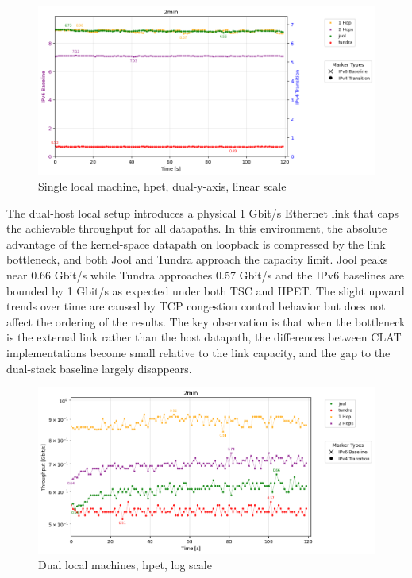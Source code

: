 \begin{figure}[H]
    \centering
    \includegraphics[width=1\textwidth]{resources/finalPlots/Jitterplots/LocalSingle_tcp_dualAxis_hpet_2min_linear.png}
    \caption{Single local machine, hpet, dual-y-axis, linear scale}
    \label{fig:Local_tcp_dualAxis_hpet_linear}
\end{figure}



The dual-host local setup introduces a physical 1 Gbit/s Ethernet link that caps the achievable throughput for all datapaths. In this environment, the absolute advantage of the kernel-space datapath on loopback is compressed by the link bottleneck, and both Jool and Tundra approach the capacity limit. Jool peaks near 0.66 Gbit/s while Tundra approaches 0.57 Gbit/s and the IPv6 baselines are bounded by 1 Gbit/s as expected under both TSC and HPET. The slight upward trends over time are caused by TCP congestion control behavior\cite{rfc5681} but does not affect the ordering of the results. The key observation is that when the bottleneck is the external link rather than the host datapath, the differences between CLAT implementations become small relative to the link capacity, and the gap to the dual-stack baseline largely disappears.


\begin{figure}[H]
    \centering
    \includegraphics[width=1\textwidth]{resources/finalPlots/combinedplots/DoubleLocal_tcp_sameScale_hpet_2min_log.png}
    \caption{Dual local machines, hpet, log scale}
    \label{fig:Dual_tcp_sameScale_hpet_log}
\end{figure}

